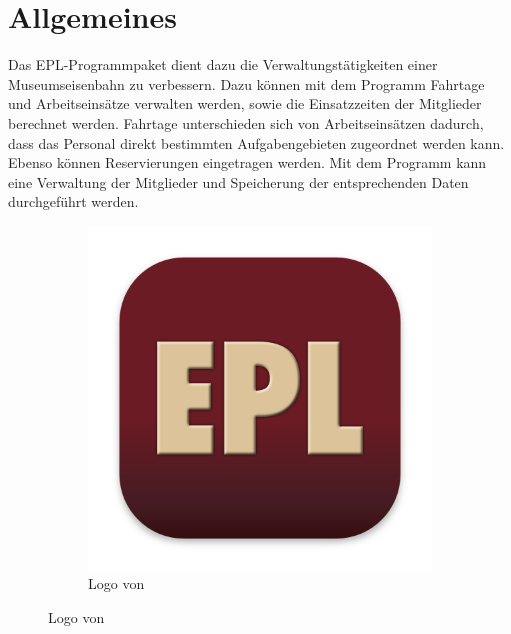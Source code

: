 \chapter{Allgemeines}

Das EPL-Programmpaket dient dazu die Verwaltungstätigkeiten einer Museumseisenbahn zu verbessern.
Dazu können mit dem Programm \Einsatz Fahrtage und Arbeitseinsätze verwalten werden, sowie die Einsatzzeiten der Mitglieder berechnet werden.
Fahrtage unterschieden sich von Arbeitseinsätzen dadurch, dass das Personal direkt bestimmten Aufgabengebieten zugeordnet werden kann.
Ebenso können Reservierungen eingetragen werden.
Mit dem Programm \Personal kann eine Verwaltung der Mitglieder und Speicherung der entsprechenden Daten durchgeführt werden.

\begin{figure}[h]
  \centering
  \begin{subfigure}{0.3\textwidth}
    \includegraphics[width=\textwidth]{../../Icon/EPL.png}
    \caption{Logo von \EPL}
  \end{subfigure}


\end{figure}
